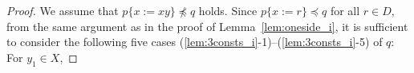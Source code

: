 \begin{proof}
We assume that $p \{ x := xy \} \not\preceq q$ holds. 
%
%
%
%
{\color{red} Since $p\{x:=r\}\preceq q$ for all $r\in D$, }
from the same argument as in the proof of Lemma~\ref{lem:oneside_i}, it is sufficient to consider the following five cases (\ref{lem:3consts_i}-1)--(\ref{lem:3consts_i}-5) of $q$: For $y_{1} \in X$,


\end{proof}
